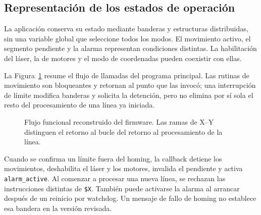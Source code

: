 \documentclass[blue,fullpaper]{ludusofficial}  %
\begin{document}
\subsection{Representación de los estados de operación}
La aplicación conserva su estado mediante banderas y estructuras distribuidas, sin una variable global que seleccione todos los modos. El movimiento activo, el segmento pendiente y la alarma representan condiciones distintas. La habilitación del láser, la de motores y el modo de coordenadas pueden coexistir con ellas.

La Figura~\ref{fig:flujo-firmware} resume el flujo de llamadas del programa principal. Las rutinas de movimiento son bloqueantes y retornan al punto que las invocó; una interrupción de límite modifica banderas y solicita la detención, pero no elimina por sí sola el resto del procesamiento de una línea ya iniciada.

\begin{figure}[htbp]
\centering
{}
\caption{Flujo funcional reconstruido del firmware. Las ramas de X--Y distinguen el retorno al bucle del retorno al procesamiento de la línea.}
\label{fig:flujo-firmware}
\end{figure}

Cuando se confirma un límite fuera del homing, la callback detiene los movimientos, deshabilita el láser y los motores, invalida el pendiente y activa \texttt{alarm\_active}. Al comenzar a procesar una nueva línea, se rechazan las instrucciones distintas de \texttt{\$X}. También puede activarse la alarma al arrancar después de un reinicio por watchdog. Un mensaje de fallo de homing no establece esa bandera en la versión revisada.
\end{document}
